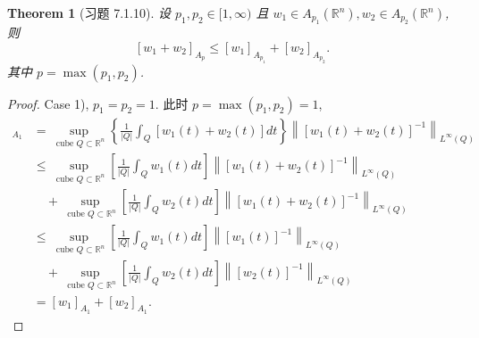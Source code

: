 \documentclass[a4paper,11pt]{article}
\newtheorem{theorem}{Theorem}[section]
\theoremstyle{definition}
\begin{document}
\begin{theorem}[习题 7.1.10]
    设 $ p_1, p_2 \in [1, \infty) $ 且 $ w_1 \in A_{p_1}(\mathbb{R}^n), w_2 \in A_{p_2}(\mathbb{R}^n) $, 则
    $$
        [w_1 + w_2]_{A_p} \leq [w_1]_{A_{p_1}} + [w_2]_{A_{p_2}}.
    $$
    其中 $ p = \max(p_1, p_2) $.
\end{theorem}

\begin{proof}
    Case 1), $ p_1 = p_2 = 1 $. 此时 $ p = \max(p_1, p_2) = 1 $,
    \begin{align*}
        [w_1 + w_2]_{A_1} 
            &= \sup_{\text{ cube } Q \subset \mathbb{R}^n} 
                \left\{ \frac{1}{|Q|} \int_Q [w_1(t) + w_2(t)] dt \right\} 
                \left\| [w_1(t) + w_2(t)]^{-1} \right\|_{L^\infty (Q)} \\
            &\leq \sup_{\text{ cube } Q \subset \mathbb{R}^n} 
                \left[ \frac{1}{|Q|} \int_Q w_1(t) dt \right]
                \left\| [w_1(t) + w_2(t)]^{-1} \right\|_{L^\infty (Q)} \\
                &\quad+ \sup_{\text{ cube } Q \subset \mathbb{R}^n} 
                    \left[ \frac{1}{|Q|} \int_Q w_2(t) dt \right]
                    \left\| [w_1(t) + w_2(t)]^{-1} \right\|_{L^\infty (Q)} \\
            &\leq \sup_{\text{ cube } Q \subset \mathbb{R}^n} 
                \left[ \frac{1}{|Q|} \int_Q w_1(t) dt \right]
                \left\| [w_1(t)]^{-1} \right\|_{L^\infty (Q)} \\
                &\quad+ \sup_{\text{ cube } Q \subset \mathbb{R}^n} 
                    \left[ \frac{1}{|Q|} \int_Q w_2(t) dt \right]
                    \left\| [w_2(t)]^{-1} \right\|_{L^\infty (Q)} \\
            &= [w_1]_{A_1} + [w_2]_{A_1}.
    \end{align*}
    

\end{proof}
\end{document}
